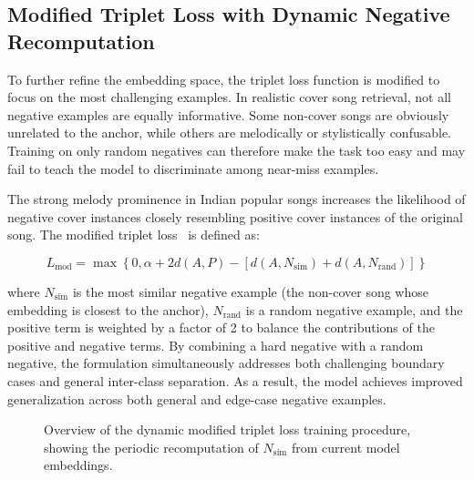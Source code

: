 \documentclass[conference]{IEEEtran}
\begin{document}
\subsection{Modified Triplet Loss with Dynamic Negative Recomputation}

To further refine the embedding space, the triplet loss function is modified to focus on the most challenging examples. In realistic cover song retrieval, not all negative examples are equally informative. Some non-cover songs are obviously unrelated to the anchor, while others are melodically or stylistically confusable. Training on only random negatives can therefore make the task too easy and may fail to teach the model to discriminate among near-miss examples.

The strong melody prominence in Indian popular songs increases the likelihood of negative cover instances closely resembling positive cover instances of the original song. The modified triplet loss~\cite{ismir_paper} is defined as:

\begin{equation}
L_{\text{mod}} = \max \left\{0, \alpha + 2 d(A, P) - \left[ d(A, N_{\text{sim}}) + d(A, N_{\text{rand}}) \right] \right\}
\label{eq:mod_triplet}
\end{equation}

where $N_{\text{sim}}$ is the most similar negative example (the non-cover song whose embedding is closest to the anchor), $N_{\text{rand}}$ is a random negative example, and the positive term is weighted by a factor of 2 to balance the contributions of the positive and negative terms. By combining a hard negative with a random negative, the formulation simultaneously addresses both challenging boundary cases and general inter-class separation. As a result, the model achieves improved generalization across both general and edge-case negative examples.

\vspace{0.5em}
\begin{figure}[htbp]
    \centering
    \caption{Overview of the dynamic modified triplet loss training procedure, showing the periodic recomputation of $N_{\text{sim}}$ from current model embeddings.}
    \label{fig:dyn_triplet}
\end{figure}
\vspace{0.5em}
\end{document}
